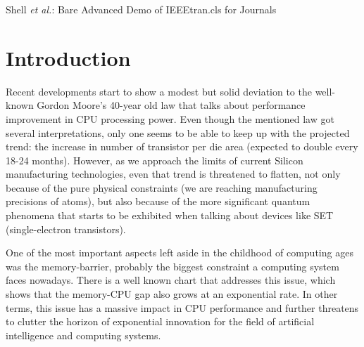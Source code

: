 \documentclass[12pt,journal,compsoc]{IEEEtran}
\begin{document}
%

 \title{}
\author{\selectfont{Tudor Voicu, Saevar Hilmarsson and Misael Hernandez}}

\markboth{}%
{Shell \MakeLowercase{\textit{et al.}}: Bare Advanced Demo of IEEEtran.cls for Journals}

\maketitle

\IEEEdisplaynontitleabstractindextext

\IEEEpeerreviewmaketitle

\section{Introduction}

\indent Recent developments start to show a modest but solid deviation to the well-known Gordon Moore's 40-year old law that talks about performance improvement in CPU processing power. Even though the mentioned law got several interpretations, only one seems to be able to keep up with the projected trend: the increase in number of transistor per die area (expected to double every 18-24 months). However, as we approach the limits of current Silicon manufacturing technologies, even that trend is threatened to flatten, not only because of the pure physical constraints (we are reaching manufacturing precisions of atoms), but also because of the more significant quantum phenomena that starts to be exhibited when talking about devices like SET (single-electron transistors).

One of the most important aspects left aside in the childhood of computing ages was the memory-barrier, probably the biggest constraint a computing system faces nowadays. There is a well known chart that addresses this issue, which shows that the memory-CPU gap also grows at an exponential rate. In other terms, this issue has a massive impact in CPU performance and further threatens to clutter the horizon of exponential innovation for the field of artificial intelligence and computing systems.
\end{document}
